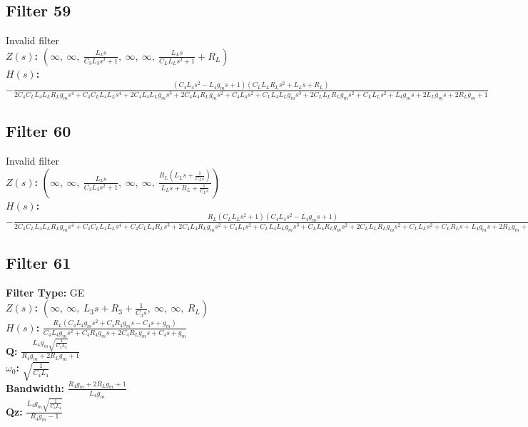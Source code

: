 \documentclass{article}
\begin{document}
\subsection*{Filter 59}
Invalid filter \\ 
\textbf{$Z(s)$:} $\left( \infty, \  \infty, \  \frac{L_{3} s}{C_{3} L_{3} s^{2} + 1}, \  \infty, \  \infty, \  \frac{L_{L} s}{C_{L} L_{L} s^{2} + 1} + R_{L}\right)$ \\ 
\textbf{$H(s)$:} $- \frac{\left(C_{4} L_{4} s^{2} - L_{4} g_{m} s + 1\right) \left(C_{L} L_{L} R_{L} s^{2} + L_{L} s + R_{L}\right)}{2 C_{4} C_{L} L_{4} L_{L} R_{L} g_{m} s^{4} + C_{4} C_{L} L_{4} L_{L} s^{4} + 2 C_{4} L_{4} L_{L} g_{m} s^{3} + 2 C_{4} L_{4} R_{L} g_{m} s^{2} + C_{4} L_{4} s^{2} + C_{L} L_{4} L_{L} g_{m} s^{3} + 2 C_{L} L_{L} R_{L} g_{m} s^{2} + C_{L} L_{L} s^{2} + L_{4} g_{m} s + 2 L_{L} g_{m} s + 2 R_{L} g_{m} + 1}$ \\ 
\subsection*{Filter 60}
Invalid filter \\ 
\textbf{$Z(s)$:} $\left( \infty, \  \infty, \  \frac{L_{3} s}{C_{3} L_{3} s^{2} + 1}, \  \infty, \  \infty, \  \frac{R_{L} \left(L_{L} s + \frac{1}{C_{L} s}\right)}{L_{L} s + R_{L} + \frac{1}{C_{L} s}}\right)$ \\ 
\textbf{$H(s)$:} $- \frac{R_{L} \left(C_{L} L_{L} s^{2} + 1\right) \left(C_{4} L_{4} s^{2} - L_{4} g_{m} s + 1\right)}{2 C_{4} C_{L} L_{4} L_{L} R_{L} g_{m} s^{4} + C_{4} C_{L} L_{4} L_{L} s^{4} + C_{4} C_{L} L_{4} R_{L} s^{3} + 2 C_{4} L_{4} R_{L} g_{m} s^{2} + C_{4} L_{4} s^{2} + C_{L} L_{4} L_{L} g_{m} s^{3} + C_{L} L_{4} R_{L} g_{m} s^{2} + 2 C_{L} L_{L} R_{L} g_{m} s^{2} + C_{L} L_{L} s^{2} + C_{L} R_{L} s + L_{4} g_{m} s + 2 R_{L} g_{m} + 1}$ \\ 
\subsection*{Filter 61}
\textbf{Filter Type:} GE \\ 
\textbf{$Z(s)$:} $\left( \infty, \  \infty, \  L_{3} s + R_{3} + \frac{1}{C_{3} s}, \  \infty, \  \infty, \  R_{L}\right)$ \\ 
\textbf{$H(s)$:} $\frac{R_{L} \left(C_{4} L_{4} g_{m} s^{2} + C_{4} R_{4} g_{m} s - C_{4} s + g_{m}\right)}{C_{4} L_{4} g_{m} s^{2} + C_{4} R_{4} g_{m} s + 2 C_{4} R_{L} g_{m} s + C_{4} s + g_{m}}$ \\ 
\textbf{Q:} $\frac{L_{4} g_{m} \sqrt{\frac{1}{C_{4} L_{4}}}}{R_{4} g_{m} + 2 R_{L} g_{m} + 1}$ \\ 
\textbf{$\omega_0$:} $\sqrt{\frac{1}{C_{4} L_{4}}}$ \\ 
\textbf{Bandwidth:} $\frac{R_{4} g_{m} + 2 R_{L} g_{m} + 1}{L_{4} g_{m}}$ \\ 
\textbf{Qz:} $\frac{L_{4} g_{m} \sqrt{\frac{1}{C_{4} L_{4}}}}{R_{4} g_{m} - 1}$ \\ 
\end{document}
